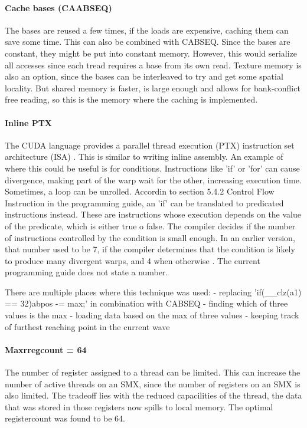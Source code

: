 \documentclass[../main/thesis.tex]{subfiles}
\begin{document}
\paragraph{Cache bases (CAABSEQ)}
The bases are reused a few times, if the loads are expensive, caching them can save some time.
This can also be combined with CABSEQ.
Since the bases are constant, they might be put into constant memory.
However, this would serialize all accesses since each tread requires a base from its own read.
Texture memory is also an option, since the bases can be interleaved to try and get some spatial locality.
But shared memory is faster, is large enough and allows for bank-conflict free reading, so this is the memory where the caching is implemented.


\paragraph{Inline PTX}
The CUDA language provides a parallel thread execution (PTX) instruction set architecture (ISA) \cite{PTX1}\cite{PTX2}.
This is similar to writing inline assembly.
An example of where this could be useful is for conditions.
Instructions like 'if' or 'for' can cause divergence, making part of the warp wait for the other, increasing execution time.
Sometimes, a loop can be unrolled.
Accordin to section 5.4.2 Control Flow Instruction in the programming guide\cite{cuda}, an 'if' can be translated to predicated instructions instead.
These are instructions whose execution depends on the value of the predicate, which is either true o false.
The compiler decides if the number of instructions controlled by the condition is small enough.
In an earlier version, that number used to be 7, if the compiler determines that the condition is likely to produce many divergent warps, and 4 when otherwise \cite{PTX3}.
The current programming guide does not state a number.

There are multiple places where this technique was used:
- replacing 'if(\_\_clz(a1) == 32){abpos -= max;}' in combination with CABSEQ
- finding which of three values is the max
- loading data based on the max of three values
- keeping track of furthest reaching point in the current wave

\paragraph{Maxrregcount = 64}
The number of register assigned to a thread can be limited.
This can increase the number of active threads on an SMX, since the number of registers on an SMX is also limited.
The tradeoff lies with the reduced capacilities of the thread, the data that was stored in those registers now spills to local memory.
The optimal registercount was found to be 64.
\end{document}
